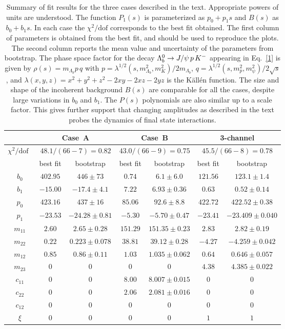 \documentclass[aps,prl,
twocolumn,nofootinbib,
superscriptaddress,preprintnumbers]{revtex4-1}
\begin{document}
\begin{table}[h]
\caption{Summary of fit results for the three cases described in the text. 
Appropriate powers of \gev units are understood.
   The function $P_1(s)$ is parameterized as $p_0 + p_1 s$
   and $B(s)$ as $b_0 + b_1 s$.
In each case the  $\chi^2/\text{dof}$ corresponds to the best fit obtained.
The first column of parameters is obtained from the best fit, and should be used to reproduce the plots. The second column reports 
   the mean value and uncertainty of the parameters from bootstrap.
The phase space factor for the decay $\Lambda_b^0 \to J/\psi\,p\, K^-$ appearing 
 in Eq.~\eqref{1} is given by $\rho(s) =m_{\Lambda_b} p\, q$ 
 with 
 $p = \lambda^{1/2}(s,m^2_{\Lambda_b},m^2_K)/2m_{\Lambda_b}$, $q = \lambda^{1/2}(s,m^2_p,m^2_\psi)/2\sqrt{s}$,
 and $\lambda(x,y,z) = x^2 + y^2 + z^2 - 2xy - 2xz - 2yz$ is the K\"all\'en function. The size and shape of the incoherent  background $B(s)$ are comparable for all the cases, despite large variations in $b_0$ and $b_1$. The $P(s)$ polynomials are also similar up to a scale factor. This gives further support that changing amplitudes as described in the text probes the dynamics of final state interactions.
}
\begin{ruledtabular}
\label{table} 
\begin{tabular}{c|cc|cc|cc}
& \multicolumn{2}{c|}{Case~A} 
& \multicolumn{2}{c|}{Case~B}  
&\multicolumn{2}{c}{3-channel} \\
\hline
$\chi^2/\text{dof}\phantom{0}$&\multicolumn{2}{c|}{$48.1/(66-7)=0.82$} & \multicolumn{2}{c|}{$43.0/(66-9)=0.75$} & \multicolumn{2}{c}{$45.5/(66-8)=0.78$}\\
\hline
& best fit & bootstrap & best fit& bootstrap& best fit& bootstrap\\
\hline
$b_0$ &$402.95$&$446\pm73 $&$0.74$& $6.1\pm 6.0$  &$121.56 $&$123.1\pm1.4$ \\
$b_1$ &$-15.00$&$-17.4\pm4.1 $ &$7.22$& $6.93\pm0.36$  &$0.63$&$0.52\pm0.14$ \\
$p_0$ &$423.16$& $437\pm16 $ &$85.06$&$92.6\pm 8.8$ &$422.72$&$422.52\pm0.38$ \\
$p_1$ &$-23.53$&$-24.28\pm0.81$&$-5.30$& $-5.70\pm0.47$&$-23.41$& $-23.409\pm0.040$ \\
$m_{11}$ &$2.60$&$2.65\pm0.28$&$151.29$&$151.35\pm0.23$&$2.83 $& $2.82\pm0.19$  \\
$m_{22}$ &$0.22$& $0.223\pm0.078$&$38.81$&$39.12\pm0.28$ &$-4.27$&$-4.259\pm0.042$  \\
$m_{12}$ &$0.85$&$0.86\pm0.11$ &$1.03 $&$1.035\pm0.062$ &$0.64$&$0.646\pm0.057$ \\
$m_{23}$ &$0$&$0$ &$0 $&$0$ &$4.38$& $4.385\pm0.022$\\
$c_{11}$  &$0$&$0$ &$8.00$&$8.007\pm0.015$ &$0$& $0$\\
$c_{22}$  &$0$&$0$ &$2.06$&$2.081\pm0.016$ &$0$&$0$\\
$c_{12}$  &$0$&$0$ &$0$&$0$ &$0$&$0$\\
$\xi$  &$0$&$0$ &$0$&$0$ &$1$&$1$\\


\end{tabular}
\end{ruledtabular}
\end{table}
\end{document}
